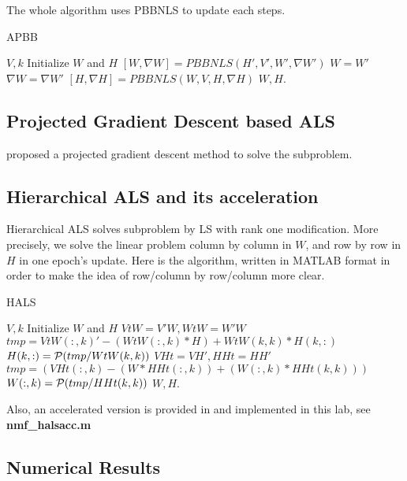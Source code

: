 \documentclass{article}
\renewcommand{\grad}{\nabla}
\begin{document}
The whole algorithm uses PBBNLS to update each steps.

\begin{algorithm}[H]
	\caption{APBB}
	\begin{algorithmic}[1]
		\REQUIRE $V, k$
		\STATE Initialize $W$ and $H$ 
		\STATE $[W,\grad W] = PBBNLS(H', V', W', \grad W')$
		\STATE $W = W'$
		\STATE $\grad W = \grad W'$
		\STATE $[H,\grad H] = PBBNLS(W,V,H,\grad H)$
		\ENDWHILE
		\STATE \Return $W,H$.
	\end{algorithmic}
\end{algorithm}
\subsection{Projected Gradient Descent based ALS}
\cite{alspgd} proposed a projected gradient descent method to solve the subproblem. 
\subsection{Hierarchical ALS and its acceleration}
Hierarchical  ALS \cite{hals} solves subproblem by LS with rank one modification. More precisely, we solve the linear problem column by column in $W$, and row by row in $H$ in one epoch's update. Here is  the algorithm, written in MATLAB format in order to make the idea of row/column by row/column more clear.

\begin{algorithm}[H]
	\caption{HALS}
	\begin{algorithmic}[1]
		\REQUIRE $V, k$
		\STATE Initialize $W$ and $H$ 
		\STATE $VtW = V'W, WtW = W'W$
		\STATE $tmp = VtW(:,k)' - (WtW(:,k) * H) + WtW(k,k)*H(k,:)$
		\STATE $H(k,:) = \P(tmp/WtW(k,k))$
		\ENDFOR
				\STATE $VHt = VH', HHt = HH'$
		\STATE $tmp = (VHt(:,k) - (W * HHt(:,k)) + (W(:,k)* HHt(k,k)))$
		\STATE $W(:,k) = \P(tmp/HHt(k,k))$
		\ENDFOR
		\ENDWHILE
		\STATE \Return $W,H$.
	\end{algorithmic}
\end{algorithm}

Also, an accelerated version is provided in \cite{muacc} and implemented in this lab, see \textbf{nmf\_halsacc.m}

\subsection{Numerical Results}
\end{document}
